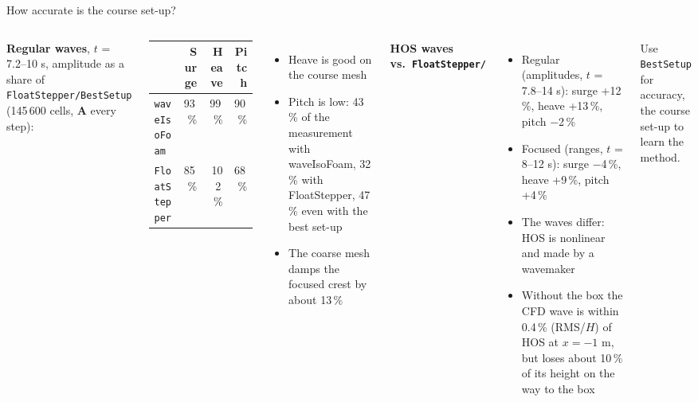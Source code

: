 \documentclass[aspectratio=169,10pt]{beamer}
\begin{document}
\begin{frame}{How accurate is the course set-up?}
  \begin{columns}[T]
    \small
    \textbf{Regular waves}, $t$ = 7.2--10 s, amplitude as a share of \texttt{FloatStepper/BestSetup}
    (145\,600 cells, $\mathbf{A}$ every step):

    \vspace{2mm}
    \renewcommand{\arraystretch}{1.2}
    \begin{tabular}{@{}lrrr@{}}
      \toprule
      & Surge & Heave & Pitch \\
      \midrule
      \texttt{waveIsoFoam} & 93\,\% & 99\,\% & 90\,\% \\
      \texttt{FloatStepper} & 85\,\% & 102\,\% & 68\,\% \\
      \bottomrule
    \end{tabular}

    \vspace{3mm}
    \begin{itemize}
      \item Heave is good on the course mesh
      \item Pitch is low: 43\,\% of the measurement with waveIsoFoam, 32\,\% with FloatStepper,
            47\,\% even with the best set-up
      \item The coarse mesh damps the focused crest by about 13\,\%
    \end{itemize}
    \small
    \textbf{HOS waves vs.\ \texttt{FloatStepper/}}
    \begin{itemize}
      \item Regular (amplitudes, $t$ = 7.8--14 s): surge +12\,\%, heave +13\,\%, pitch $-$2\,\%
      \item Focused (ranges, $t$ = 8--12 s): surge $-$4\,\%, heave +9\,\%, pitch +4\,\%
      \item The waves differ: HOS is nonlinear and made by a wavemaker
      \item Without the box the CFD wave is within 0.4\,\% (RMS/$H$) of HOS at $x=-1$ m, but loses
            about 10\,\% of its height on the way to the box
    \end{itemize}
    \alert{Use \texttt{BestSetup} for accuracy, the course set-up to learn the method.}
  \end{columns}
\end{frame}
\end{document}
